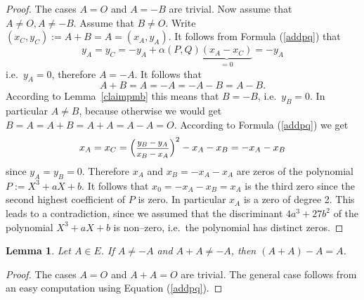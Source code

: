 \documentclass[12pt]{amsart}
\theoremstyle{plain}
\newtheorem{lemma}[theorem]{Lemma}
\theoremstyle{remark}
\theoremstyle{definition}
\newcommand{\smfrac}[2]{\mbox{\footnotesize$\displaystyle\frac{#1}{#2}$}}
\begin{document}
\begin{proof}
The cases $A=O$ and $A=-B$ are trivial.
Now assume that $A \neq O, A \neq -B$. Assume that $B\ne O$.
Write   $(x_C,y_C):=A+B=A=(x_A,y_A)$.
It follows from Formula  (\ref{addpq})   that
\[ y_A=y_C=-y_A+\alpha(P,Q) \underbrace{(x_A-x_C)}_{=0}=-y_A\]
i.e.\ $y_A=0$, therefore $A=-A$. It follows that
\[ A+B=A=-A=-A-B=A-B.\]
According to Lemma~\ref{claimpmb} this means that $B=-B$, i.e.\ $y_B=0$.
In particular $A \neq B$, because otherwise we would get $B=A=A+B=A+A=A-A=O$.
According to Formula  (\ref{addpq}) we get
\[ x_A=x_C=\left(\smfrac{y_B-y_A}{x_B-x_A}\right)^2-x_A-x_B=-x_A-x_B \]
since $y_A=y_B=0$.
Therefore $x_A$ and $x_B=-x_A-x_A$ are zeros of the polynomial $P:=X^3+aX+b$.
It follows that $x_0=-x_A-x_B=x_A$ is the third zero since the second highest coefficient of $P$ is zero.
In particular $x_A$ is a zero of degree 2. This leads to a contradiction,
since we assumed that the discriminant $4a^3+27b^2$ of the polynomial $X^3+aX+b$ is non--zero,
i.e.\ the polynomial has distinct zeros.
\end{proof}



\begin{lemma} \label{claimaaa}
Let $A\in E$. If $A \neq -A$ and $A+A \neq -A$,
then
$(A+A)-A=A$.
\end{lemma}

\begin{proof}
The cases $A=O$ and $A+A=O$ are trivial. The general case follows from an easy computation
using Equation (\ref{addpq}).
\end{proof}
\end{document}
